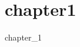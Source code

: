 \documentclass[10pt,a4j,dvipdfmx,report]{jsarticle}
\begin{document}
\chapter{chapter1} %
\label{cha:chapter1}

chapter\_1

\end{document}
